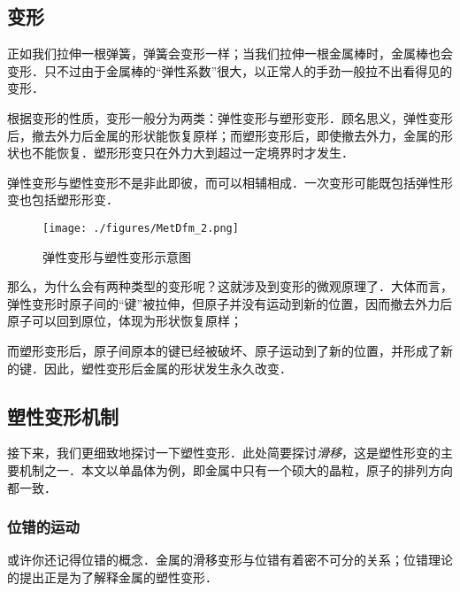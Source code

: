 
\subsection{变形}
正如我们拉伸一根弹簧，弹簧会变形一样；当我们拉伸一根金属棒时，金属棒也会变形．只不过由于金属棒的“弹性系数”很大，以正常人的手劲一般拉不出看得见的变形．

\begin{example}{}
\begin{figure}[ht]
\centering
\texttt{[image: ./figures/MetDfm\_1.png]}
\caption{框架结构}} \label{MetDfm_fig1}
\end{figure}
与弹簧类似，金属结构提供的支持力也源自金属的细微变形．．．只要在安全的范围内．
\end{example}

根据变形的性质，变形一般分为两类：弹性变形与塑形变形．顾名思义，弹性变形后，撤去外力后金属的形状能恢复原样；而塑形变形后，即使撤去外力，金属的形状也不能恢复．塑形形变只在外力大到超过一定境界时才发生．

弹性变形与塑性变形不是非此即彼，而可以相辅相成．一次变形可能既包括弹性形变也包括塑形形变．

\begin{figure}[ht]
\centering
\texttt{[image: ./figures/MetDfm\_2.png]}
\caption{弹性变形与塑性变形示意图} \label{MetDfm_fig2}
\end{figure}

那么，为什么会有两种类型的变形呢？这就涉及到变形的微观原理了．大体而言，弹性变形时原子间的“键”被拉伸，但原子并没有运动到新的位置，因而撤去外力后原子可以回到原位，体现为形状恢复原样；

而塑形变形后，原子间原本的键已经被破坏、原子运动到了新的位置，并形成了新的键．因此，塑性变形后金属的形状发生永久改变．

\subsection{塑性变形机制}
接下来，我们更细致地探讨一下塑性变形．此处简要探讨\textsl{滑移}，这是塑性形变的主要机制之一．本文以单晶体为例，即金属中只有一个硕大的晶粒，原子的排列方向都一致．

\subsubsection{位错的运动}
或许你还记得位错的概念．金属的滑移变形与位错有着密不可分的关系；位错理论的提出正是为了解释金属的塑性变形．

